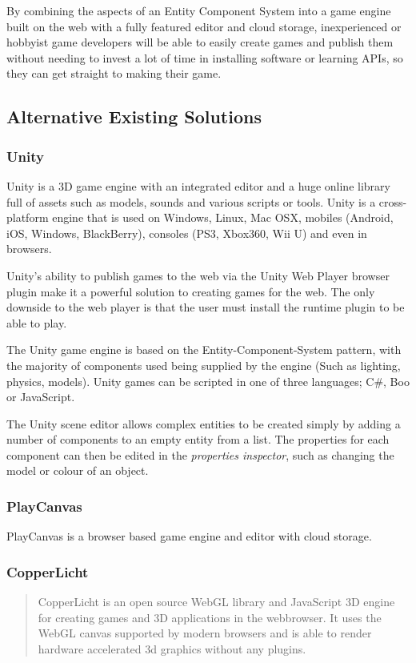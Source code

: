 \documentclass[a4paper, 12pt]{article}
\begin{document}
By combining the aspects of an Entity Component System into a game engine built on the web with a fully featured editor and cloud storage, inexperienced or hobbyist game developers will be able to easily create games and publish them without needing to invest a lot of time in installing software or learning APIs, so they can get straight to making their game.

\subsection{Alternative Existing Solutions}
\subsubsection{Unity}
Unity is a 3D game engine with an integrated editor and a huge online library full of assets such as models, sounds and various scripts or tools. Unity is a cross-platform engine that is used on Windows, Linux, Mac OSX, mobiles (Android, iOS, Windows, BlackBerry), consoles (PS3, Xbox360, Wii U) and even in browsers.\cite{unity}

Unity's ability to publish games to the web via the Unity Web Player browser plugin make it a powerful solution to creating games for the web. The only downside to the web player is that the user must install the runtime plugin to be able to play.\cite{unityweb}

The Unity game engine is based on the Entity-Component-System pattern, with the majority of components used being supplied by the engine (Such as lighting, physics, models).\cite{unitycomponents} Unity games can be scripted in one of three languages; C\#, Boo or JavaScript.

The Unity scene editor allows complex entities to be created simply by adding a number of components to an empty entity from a list. The properties for each component can then be edited in the \emph{properties inspector}, such as changing the model or colour of an object. \cite{unitycreatingscenes}


\subsubsection{PlayCanvas}
PlayCanvas is a browser based game engine and editor with cloud storage. 


\subsubsection{CopperLicht}
\begin{quote}
CopperLicht is an open source WebGL library and JavaScript 3D engine for creating games and 3D applications in the webbrowser. It uses the WebGL canvas supported by modern browsers and is able to render hardware accelerated 3d graphics without any plugins.\cite{copperlicht}
\end{quote}
\end{document}

